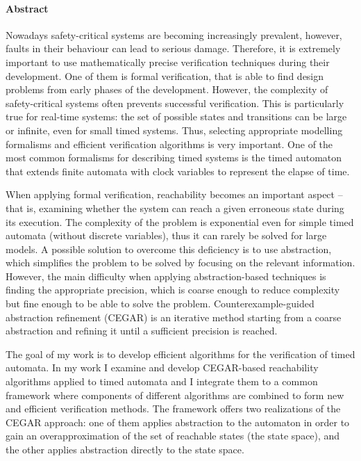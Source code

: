 

\paragraph*{Abstract}
{}
\thispagestyle{plain}

Nowadays safety-critical systems are becoming increasingly prevalent, however, faults in their behaviour can lead to serious damage. Therefore, it is extremely important to use mathematically precise verification techniques during their development. One of them is formal verification, that is able to find design problems from early phases of the development. However, the complexity of safety-critical systems often prevents successful verification. This is particularly true for real-time systems: the set of possible states and transitions can be large or infinite, even for small timed systems. Thus, selecting appropriate modelling formalisms and efficient verification algorithms is very important. One of the most common formalisms for describing timed systems is the timed automaton that extends finite automata with clock variables to represent the elapse of time.

When applying formal verification, reachability becomes an important aspect – that is, examining whether the system can reach a given erroneous state during its execution. The complexity of the problem is exponential even for simple timed automata (without discrete variables), thus it can rarely be solved for large models. A possible solution to overcome this deficiency is to use abstraction, which simplifies the problem to be solved by focusing on the relevant information. However, the main difficulty when applying abstraction-based techniques is finding the appropriate precision, which is coarse enough to reduce complexity but fine enough to be able to solve the problem. Counterexample-guided abstraction refinement (CEGAR) is an iterative method starting from a coarse abstraction and refining it until a sufficient precision is reached.

The goal of my work is to develop efficient algorithms for the verification of timed automata. In my work I examine and develop CEGAR-based reachability algorithms applied to timed automata and I integrate them to a common framework where components of different algorithms are combined to form new and efficient verification methods. The framework offers two realizations of the CEGAR approach: one of them applies abstraction to the automaton in order to gain an overapproximation of the set of reachable states (the state space), and the other applies abstraction directly to the state space.

